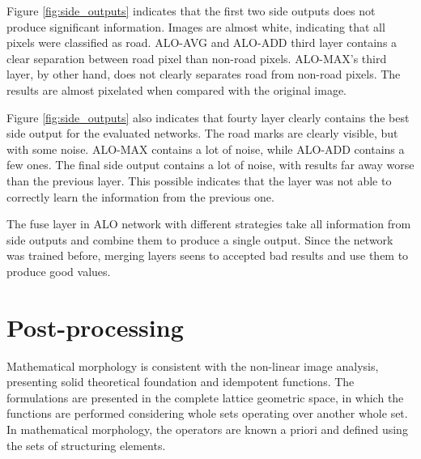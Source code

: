 Figure \ref{fig:side_outputs} indicates that the first two side outputs does not produce significant information. Images are almost white, indicating that all pixels were classified as road. ALO-AVG and ALO-ADD third layer contains a clear separation between road pixel than non-road pixels. ALO-MAX's third layer, by other hand, does not clearly separates road from non-road pixels. The results are almost pixelated when compared with the original image.

Figure \ref{fig:side_outputs} also indicates that fourty layer clearly contains the best side output for the evaluated networks. The road marks are clearly visible, but with some noise. ALO-MAX contains a lot of noise, while ALO-ADD contains a few ones. The final side output contains a lot of noise, with results far away worse than the previous layer. This possible indicates that the layer was not able to correctly learn the information from the previous one.

The fuse layer in ALO network with different strategies take all information from side outputs and combine them to produce a single output. Since the network was trained before, merging layers seens to accepted bad results and use them to produce good values.

%

\section{Post-processing}


Mathematical morphology is consistent with the non-linear image analysis, presenting solid theoretical foundation and idempotent functions. The formulations are presented in the complete lattice geometric space, in which the functions are performed considering whole sets operating over another whole set. In mathematical morphology, the operators are known a priori and defined using the sets of structuring elements.

